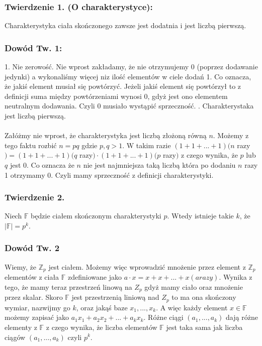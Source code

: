 \subsubsection{Twierdzenie 1. (O charakterystyce):}
Charakterystyka ciała skończonego zawsze jest dodatnia i jest liczbą pierwszą.
\subsubsection{Dowód Tw. 1:}
 1. Nie zerowość. \newline \newline
 Nie wprost zakładamy, że nie otrzymujemy 0 (poprzez dodawanie jedynki) a wykonaliśmy więcej niz ilość elementów w ciele dodań 1. Co oznacza, że jakiś element musiał się powtórzyć. Jeżeli jakiś element się powtórzył to z definicji suma między powtórzeniami wynosi 0, gdyż jest ono elementem neutralnym dodawania. Czyli 0 musiało wystąpić sprzeczność.
\newline {}. Charakterystaka jest liczbą pierwszą.\\ \\
 Załóżmy nie wprost, że charakterystyka jest liczbą złożoną równą $n$. Możemy z tego faktu rozbić $n = pq$ gdzie $p,q > 1$. W takim razie $(1+1+...+1) (n$ razy$) = (1+1+...+1) (q$ razy$) \cdot (1+1+...+1) (p$ razy$)$ z czego wynika, że $p$ lub $q$ jest 0. Co oznacza że $n$ nie jest najmniejsza taką liczbą która po dodaniu $n$ razy 1 otrzymamy 0. Czyli mamy sprzeczność z definicji charakterystyki.
 \subsubsection{Twierdzenie 2.}
 Niech $\mathbb{F}$ będzie ciałem skończonym charakterystyki $p$. Wtedy istnieje takie $k$, że $|\mathbb{F}| = p^k$.
 \subsubsection{Dowód Tw. 2}
Wiemy, że $\mathbb{Z}_p$ jest ciałem. Możemy więc wprowadzić mnożenie przez element z $\mathbb{Z}_p$ elementów z ciała $\mathbb{F}$ zdefiniowane jako $a\cdot x = x + x + ... + x (a razy)$. Wynika z tego, że mamy teraz przestrzeń linową na $Z_p$ gdyż mamy ciało oraz mnożenie przez skalar. Skoro $\mathbb{F}$ jest przestrzenią liniową nad $Z_p$ to ma ona skończony wymiar, nazwijmy go $k$, oraz jakąś baze $x_1,...,x_k$. A więc każdy element $x \in \mathbb{F}$ możemy zapisać jako $a_1x_1 + a_2x_2 + ... + a_kx_k$. Różne ciągi $(a_1,...,a_k)$ dają różne elementy z $\mathbb{F}$ z czego wynika, że liczba elementów $\mathbb{F}$ jest taka sama jak liczba ciągów $(a_1,...,a_k)$ czyli $p^k$.
